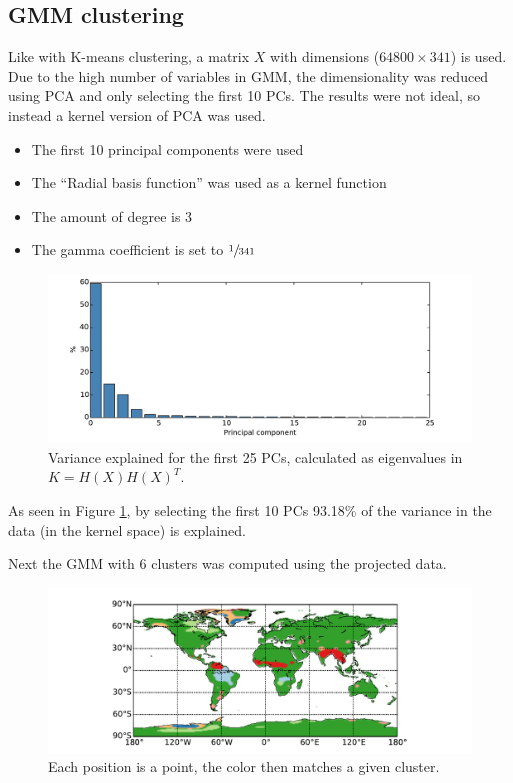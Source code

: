 \subsection{GMM clustering}
\label{section:result-gmm}

Like with K-means clustering, a matrix $X$ with dimensions ($64800 \times 341$) is used. Due to the high number of variables in GMM, the dimensionality was reduced using PCA and only selecting the first 10 PCs.
The results were not ideal, so instead a kernel version of PCA was used.

\begin{itemize}
\item The first 10 principal components were used
\item The ``Radial basis function'' was used as a kernel function
\item The amount of degree is 3
\item The gamma coefficient is set to $\sfrac{1}{341}$
\end{itemize}

\begin{figure}[H]
	\center
	\includegraphics[width=\textwidth]{figures/gmm-pca-explaned}
	\caption{Variance explained for the first 25 PCs, calculated as eigenvalues in $K = H(X) H(X)^T$.}
	\label{fig:gmm-pca-explaned}
\end{figure}

As seen in Figure \ref{fig:gmm-pca-explaned}, by selecting the first 10 PCs 93.18\% of the variance in the data (in the kernel space) is explained.

Next the GMM with 6 clusters was computed using the projected data. 
\begin{figure}[H]
	\center
	\includegraphics[width=\textwidth]{figures/gmm-world}
	\caption{Each position is a point, the color then matches a given cluster.}
\end{figure}

